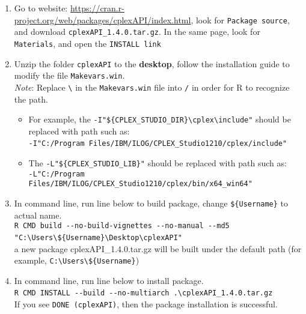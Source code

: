 \documentclass[]{article}
\providecommand{\tightlist}{%
  \setlength{\itemsep}{0pt}\setlength{\parskip}{0pt}}
\begin{document}
\begin{enumerate}
\def\labelenumi{\arabic{enumi}.}
\item
  Go to website: \url{https://cran.r-project.org/web/packages/cplexAPI/index.html}, look for \texttt{Package source}, and download \texttt{cplexAPI\_1.4.0.tar.gz}. In the same page, look for \texttt{Materials}, and open the \texttt{INSTALL link}
\item
  Unzip the folder \texttt{cplexAPI} to the \textbf{desktop}, follow the installation guide to modify the file \texttt{Makevars.win}.\\
  \emph{Note}: Replace \texttt{\textbackslash{}} in the \texttt{Makevars.win} file into \texttt{/} in order for R to recognize the path.

  \begin{itemize}
  \tightlist
  \item
    For example, the \texttt{-I"\$\{CPLEX\_STUDIO\_DIR\}\textbackslash{}cplex\textbackslash{}include"} should be replaced with path such as:\\
    \texttt{-I"C:/Program Files/IBM/ILOG/CPLEX\_Studio1210/cplex/include"}~\\
  \item
    The \texttt{-L"\$\{CPLEX\_STUDIO\_LIB\}"} should be replaced with path such as:\\
    \texttt{-L"C:/Program Files/IBM/ILOG/CPLEX\_Studio1210/cplex/bin/x64\_win64"}
  \end{itemize}
\item
  In command line, run line below to build package, change \texttt{\$\{Username\}} to actual name.\\
  \texttt{R CMD build -\/-no-build-vignettes -\/-no-manual -\/-md5 "C:\textbackslash{}Users\textbackslash{}\$\{Username\}\textbackslash{}Desktop\textbackslash{}cplexAPI"}~\\
  a new package cplexAPI\_1.4.0.tar.gz will be built under the default path (for example, \texttt{C:\textbackslash{}Users\textbackslash{}\$\{Username\}})
\item
  In command line, run line below to install package.\\
  \texttt{R CMD INSTALL -\/-build -\/-no-multiarch .\textbackslash{}cplexAPI\_1.4.0.tar.gz}~\\
  If you see \texttt{DONE (cplexAPI)}, then the package installation is successful.


\end{enumerate}
\end{document}
